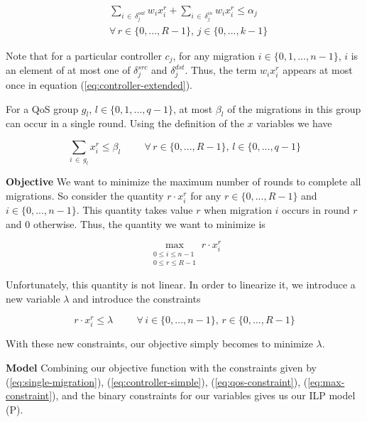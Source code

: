 \documentclass[conference]{IEEEtran}
\begin{document}
\begin{equation}\label{eq:controller-extended}
\begin{split}
    &\sum_{i \, \in \, \delta^{out}_{j}} w_{i}x^{r}_{i} + \sum_{i \, \in \, \delta^{in}_{j}} w_{i}x^{r}_{i} \leq \alpha_{j} \\
    &\forall \, r \in \{0, ..., R-1\}, \, j \in \{0, ..., k-1\}
\end{split}
\end{equation}

Note that for a particular controller $c_{j}$, for any migration $i \in \{0, 1, ..., n-1\}$, $i$ is an element of at most one of $\delta^{src}_{j}$ and $\delta^{dst}_{j}$. Thus, the term $w_{i}x^{r}_{i}$ appears at most once in equation (\ref{eq:controller-extended}).

\noindent For a QoS group $g_{l}$, $l \in \{0, 1, ..., q-1\}$, at most $\beta_{l}$ of the migrations in this group can occur in a single round. Using the definition of the $x$ variables we have

\begin{equation}\label{eq:qos-constraint}
    \sum_{i \, \in \, g_{l}} x^{r}_{i} \leq \beta_{l} \hspace{1cm} \forall \, r \in \{0, ..., R - 1\}, \, l \in \{0, ..., q-1\}
\end{equation}

\noindent\textbf{Objective}
We want to minimize the maximum number of rounds to complete all migrations. So consider the quantity $r \cdot x^{r}_{i}$ for any $r \in \{0, ..., R - 1\}$ and $i \in \{0, ..., n - 1\}$. This quantity takes value $r$ when migration $i$ occurs in round $r$ and 0 otherwise. Thus, the quantity we want to minimize is

$$\max_{\substack{0 \leq i \leq n - 1 \\ 0 \leq r \leq R - 1}} r  \cdot x^{r}_{i}$$

Unfortunately, this quantity is not linear. In order to linearize it, we introduce a new variable $\lambda$ and introduce the constraints

\begin{equation}\label{eq:max-constraint}
    r \cdot x^{r}_{i} \leq \lambda \hspace{1cm} \forall \, i \in \{0, ..., n-1\}, \, r \in \{0, ..., R - 1\}
\end{equation}

With these new constraints, our objective simply becomes to minimize $\lambda$.

\noindent\textbf{Model}
\noindent Combining our objective function with the constraints given by (\ref{eq:single-migration}), (\ref{eq:controller-simple}), (\ref{eq:qos-constraint}), (\ref{eq:max-constraint}), and the binary constraints for our variables gives us our ILP model (P).\newline
\end{document}

